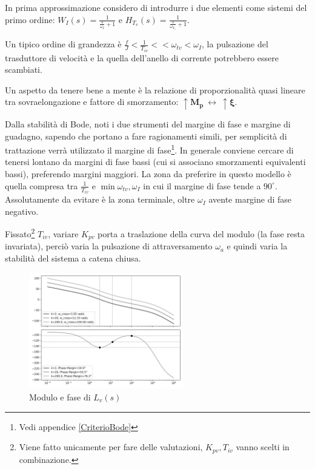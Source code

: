 In prima approssimazione considero di introdurre i due elementi come sistemi del primo ordine: \(W_I(s) = \frac{1}{\frac{s}{\omega_I}+1}\) e \(H_{T_v}(s) = \frac{1}{\frac{s}{\omega_{T_v}}+1}\).

Un tipico ordine di grandezza è \(\frac{f}{J} < \frac{1}{T_{iv}} << \omega_{tv} < \omega_I\), la pulsazione del trasduttore di velocità e la quella dell'anello di corrente potrebbero essere scambiati.

Un aspetto da tenere bene a mente è la relazione di proporzionalità quasi lineare tra sovraelongazione e fattore di smorzamento: \(\uparrow \mathbf{M_p} \ \leftrightarrow \ \uparrow \boldsymbol{\xi}\).

Dalla stabilità di Bode, noti i due strumenti del margine di fase e margine di guadagno, sapendo che portano a fare ragionamenti simili, per semplicità di trattazione verrà utilizzato il margine di fase\footnote{Vedi appendice \ref{CriterioBode}}.
In generale conviene cercare di tenersi lontano da margini di fase bassi (cui si associano smorzamenti equivalenti bassi), preferendo margini maggiori. La zona da preferire in questo modello è quella compresa tra \(\frac{1}{T_{iv}}\) e \(\min{\omega_{tv},\omega_I}\) in cui il margine di fase tende a \(90^\circ\). Assolutamente da evitare è la zona terminale, oltre \(\omega_I\) avente margine di fase negativo.

Fissato\footnote{Viene fatto unicamente per fare delle valutazioni, \(K_{pv}, T_{iv}\) vanno scelti in combinazione. {\color{red}{Vanno effettivamente scelti in combinazione?}}} \(T_{iv}\), variare \(K_{pv}\) porta a traslazione della curva del modulo (la fase resta invariata), perciò varia la pulsazione di attraversamento \(\omega_a\) e quindi varia la stabilità del sistema a catena chiusa.

\begin{figure}[h]
    \centering
    \includegraphics[width=0.6\textwidth]{Immagini/anello_aperto_anello_corrente.png}
    \caption{Modulo e fase di \(L_v(s)\)}
\end{figure}

